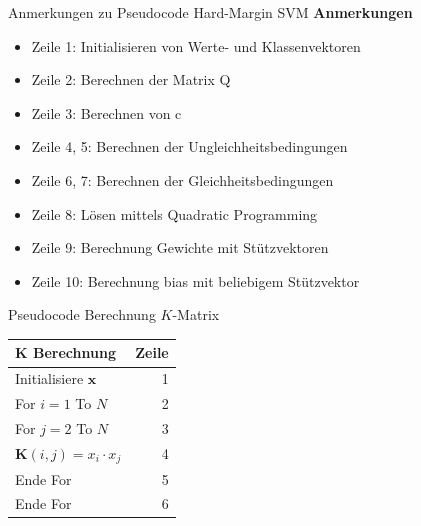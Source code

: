 \documentclass[ngerman]{beamer}
\begin{document}
\begin{frame}{Anmerkungen zu Pseudocode Hard-Margin SVM}
    \textbf{Anmerkungen} \\
    \begin{itemize}
        \item Zeile 1: Initialisieren von Werte- und Klassenvektoren
        \item Zeile 2: Berechnen der Matrix Q
        \item Zeile 3: Berechnen von c
        \item Zeile 4, 5: Berechnen der Ungleichheitsbedingungen
        \item Zeile 6, 7: Berechnen der Gleichheitsbedingungen
        \item Zeile 8: Lösen mittels Quadratic Programming
        \item Zeile 9: Berechnung Gewichte mit Stützvektoren
        \item Zeile 10: Berechnung bias mit beliebigem Stützvektor
    \end{itemize}
\end{frame}

\begin{frame}{Pseudocode Berechnung $K$-Matrix}
    \begin{tabular}{|l r|}
        \hline
        $\mathbf{K}$ \textbf{Berechnung} & \textbf{Zeile} \\
        \hline
        Initialisiere $\mathbf{x}$ & 1 \\
        For $i=1$ To $N$ & 2 \\
        \quad For $j=2$ To $N$ & 3 \\
        \quad\quad $\mathbf{K}\left( i, j \right) = x_{i} \cdot x_{j}$ & 4 \\
        \quad Ende For & 5 \\
        Ende For & 6 \\
        \hline
    \end{tabular}
\end{frame}
\end{document}
